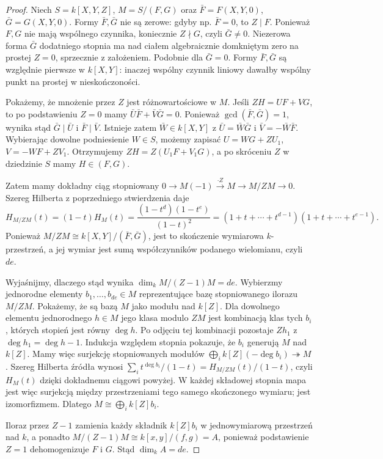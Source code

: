 \begin{proof}
Niech $S=k[X,Y,Z]$, $M=S/(F,G)$ oraz
$\bar F=F(X,Y,0)$, $\bar G=G(X,Y,0)$.
Formy $\bar F,\bar G$ nie są zerowe: gdyby np.
$\bar F=0$, to $Z\mid F$. Ponieważ $F,G$ nie mają
wspólnego czynnika, koniecznie $Z\nmid G$,
czyli $\bar G\ne0$. Niezerowa forma $\bar G$
dodatniego stopnia ma nad ciałem algebraicznie
domkniętym zero na prostej $Z=0$, sprzecznie
z założeniem. Podobnie dla $\bar G=0$. Formy
$\bar F,\bar G$ są względnie pierwsze w $k[X,Y]$:
inaczej wspólny czynnik liniowy dawałby wspólny punkt
na prostej w nieskończoności.

Pokażemy, że mnożenie przez $Z$ jest różnowartościowe
w $M$. Jeśli $ZH=UF+VG$, to po podstawieniu $Z=0$
mamy $\bar U\bar F+\bar V\bar G=0$.
Ponieważ $\gcd(\bar F,\bar G)=1$, wynika stąd
$\bar G\mid\bar U$ i $\bar F\mid\bar V$.
Istnieje zatem $\bar W\in k[X,Y]$ z
$\bar U=\bar W\bar G$ i $\bar V=-\bar W\bar F$.
Wybierając dowolne podniesienie $W\in S$, możemy zapisać
$U=WG+ZU_1$, $V=-WF+ZV_1$. Otrzymujemy
$ZH=Z(U_1F+V_1G)$, a po skróceniu $Z$
w dziedzinie $S$ mamy $H\in(F,G)$.

Zatem mamy dokładny ciąg stopniowany
$0\to M(-1)\xrightarrow{\cdot Z}M\to M/ZM\to0$.
Szereg Hilberta z poprzedniego stwierdzenia daje
\[
 H_{M/ZM}(t)=(1-t)H_M(t)
 =\frac{(1-t^d)(1-t^e)}{(1-t)^2}
 =(1+t+\cdots+t^{d-1})(1+t+\cdots+t^{e-1}).
\]
Ponieważ $M/ZM\cong k[X,Y]/(\bar F,\bar G)$,
jest to skończenie wymiarowa $k$-przestrzeń, a jej
wymiar jest sumą współczynników podanego wielomianu,
czyli $de$.

Wyjaśnijmy, dlaczego stąd wynika $\dim_kM/(Z-1)M=de$.
Wybierzmy jednorodne elementy $b_1,\ldots,b_{de}\in M$
reprezentujące bazę stopniowanego ilorazu $M/ZM$.
Pokażemy, że są bazą $M$ jako modułu nad $k[Z]$.
Dla dowolnego elementu jednorodnego $h\in M$ jego klasa
modulo $ZM$ jest kombinacją klas tych $b_i$, których
stopień jest równy $\deg h$. Po odjęciu tej kombinacji
pozostaje $Zh_1$ z $\deg h_1=\deg h-1$.
Indukcja względem stopnia pokazuje, że $b_i$ generują $M$
nad $k[Z]$. Mamy więc surjekcję stopniowanych modułów
$\bigoplus_i k[Z](-\deg b_i)\twoheadrightarrow M$.
Szereg Hilberta źródła wynosi
$\sum_i t^{\deg b_i}/(1-t)=H_{M/ZM}(t)/(1-t)$,
czyli $H_M(t)$ dzięki dokładnemu ciągowi powyżej.
W każdej składowej stopnia mapa jest więc surjekcją
między przestrzeniami tego samego skończonego wymiaru;
jest izomorfizmem. Dlatego $M\cong\bigoplus_i k[Z]b_i$.

Iloraz przez $Z-1$ zamienia każdy składnik $k[Z]b_i$
w jednowymiarową przestrzeń nad $k$, a ponadto
$M/(Z-1)M\cong k[x,y]/(f,g)=A$, ponieważ podstawienie
$Z=1$ dehomogenizuje $F$ i $G$. Stąd $\dim_kA=de$.
\end{proof}

